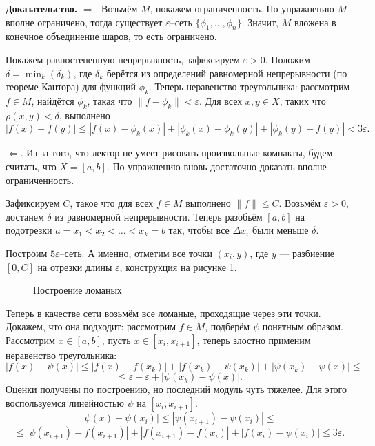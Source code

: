 \textbf{Доказательство.} $\Rightarrow$. Возьмём $M$, покажем ограниченность.
По упражнению $M$ вполне ограничено, тогда существует $\varepsilon$--сеть $\{\phi_1, \dots, \phi_n\}$.
Значит, $M$ вложена в конечное объединение шаров, то есть ограничено.

Покажем равностепенную непрерывность, зафиксируем $\varepsilon > 0$.
Положим $\delta = \min_k(\delta_k)$, где $\delta_k$ берётся из определений равномерной непрерывности (по теореме Кантора) для функций $\phi_k$.
Теперь неравенство треугольника: рассмотрим $f \in M$, найдётся $\phi_k$, такая что $\|f - \phi_k\| < \varepsilon$.
Для всех $x, y \in X$, таких что $\rho(x, y) < \delta$, выполнено
\[
    |f(x) - f(y)| \le |f(x) - \phi_k(x)| + |\phi_k(x) - \phi_k(y)| + |\phi_k(y) - f(y)| < 3 \varepsilon.
\]

$\Leftarrow$. Из-за того, что лектор не умеет рисовать произвольные компакты, будем считать, что $X = [a, b]$.
По упражнению вновь достаточно доказать вполне ограниченность.

Зафиксируем $C$, такое что для всех $f \in M$ выполнено $\|f\| \le C$.
Возьмём $\varepsilon > 0$, достанем $\delta$ из равномерной непрерывности.
Теперь разобьём $[a, b]$ на подотрезки $a = x_1 < x_2 < \dots < x_k = b$ так, чтобы все $\Delta x_i$ были меньше $\delta$.

Построим $5 \varepsilon$--сеть.
А именно, отметим все точки $(x_i, y)$, где $y$ --- разбиение $[0, C]$ на отрезки длины $\varepsilon$, конструкция на рисунке 1.

\begin{figure}[ht]
    \centering
    \caption{Построение ломаных}
\end{figure}

Теперь в качестве сети возьмём все ломаные, проходящие через эти точки.
Докажем, что она подходит: рассмотрим $f \in M$, подберём $\psi$ понятным образом.
Рассмотрим $x \in [a, b]$, пусть $x \in [x_i, x_{i+1}]$, теперь злостно применим неравенство треугольника:
\[
    |f(x) - \psi(x)| \le |f(x) - f(x_k)| + |f(x_k) - \psi(x_k)| + |\psi(x_k) - \psi(x)| \le
\]
\[
    \le \varepsilon + \varepsilon + |\psi(x_k) - \psi(x)|.
\]
Оценки получены по построению, но последний модуль чуть тяжелее.
Для этого воспользуемся линейностью $\psi$ на $[x_i, x_{i+1}]$.
\[
    |\psi(x) - \psi(x_i)| \le |\psi(x_{i+1}) - \psi(x_i)| \le
\]
\[
    \le |\psi(x_{i+1}) - f(x_{i+1})| + |f(x_{i+1}) - f(x_i)| + |f(x_i) - \psi(x_i)| \le 3 \varepsilon.
\]

\QED

